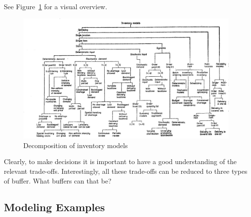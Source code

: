 \begin{exercise}
See Figure~\ref{fig:costs} for a visual overview.

\begin{figure}
\centering
\includegraphics[width=\textwidth]{figures/chikan.png}
\caption{Decomposition of inventory models}
\label{fig:costs}
\end{figure}


\end{exercise}



\begin{exercise}
  Clearly, to make decisions it is important to have a good understanding
  of the relevant trade-offs. Interestingly, all these trade-offs can
  be reduced to three types of buffer. What buffers can that be?

\end{exercise}



\subsection{Modeling Examples}
\label{sec:examples}

